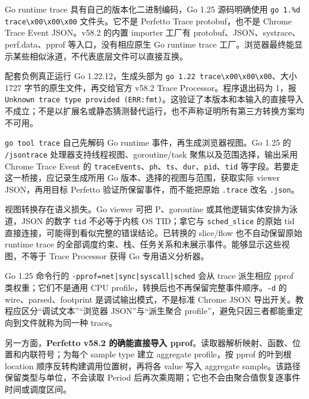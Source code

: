\documentclass[UTF8,fontset=fandol,openany,11pt]{ctexbook}
\begin{document}
Go runtime trace 具有自己的版本化二进制编码，Go 1.25 源码明确使用 \texttt{go 1.\allowbreak{}\%d trace\textbackslash{}x00\textbackslash{}x00\textbackslash{}x00} 文件头。它不是 Perfetto Trace protobuf，也不是 Chrome Trace Event JSON。v58.2 的内置 importer 工厂有 protobuf、JSON、systrace、perf.data、pprof 等入口，没有相应原生 Go runtime trace 工厂。浏览器最终能显示某些相似泳道，不代表底层文件可以直接互换。\cite{pf-go-header}\cite{pf-importers}


配套负例真正运行 Go 1.22.12，生成头部为 \texttt{go 1.\allowbreak{}22 trace\textbackslash{}x00\textbackslash{}x00\textbackslash{}x00}、大小 1727 字节的原生文件，再交给官方 v58.2 Trace Processor。程序退出码为 1，报 \texttt{Unknown trace type provided (ERR:fmt)}。这验证了本版本和本输入的直接导入不成立；不是以扩展名或静态猜测替代运行，也不声称证明所有第三方转换方案均不可用。\cite{pf-validation}


\texttt{go tool trace} 自己先解码 Go runtime 事件，再生成浏览器视图。Go 1.25 的 \texttt{/\allowbreak{}jsontrace} 处理器支持线程视图、goroutine/task 聚焦以及范围选择，输出采用 Chrome Trace Event 的 \texttt{traceEvents}、\texttt{ph}、\texttt{ts}、\texttt{dur}、\texttt{pid}、\texttt{tid} 等字段。若要走这一桥接，应记录生成所用 Go 版本、选择的视图与范围，获取实际 viewer JSON，再用目标 Perfetto 验证所保留事件，而不能把原始 \texttt{.\allowbreak{}trace} 改名 \texttt{.\allowbreak{}json}。\cite{pf-go-json}\cite{pf-go-format}


视图转换存在语义损失。Go viewer 可把 P、goroutine 或其他逻辑实体安排为泳道，JSON 的数字 \texttt{tid} 不必等于内核 OS TID；拿它与 \texttt{sched\_\allowbreak{}slice} 的原始 tid 直接连接，可能得到看似完整的错误结论。已转换的 slice/flow 也不自动保留原始 runtime trace 的全部调度约束、栈、任务关系和未展示事件。能够显示这些视图，不等于 Trace Processor 获得 Go 专用语义分析器。\cite{pf-go-json}\cite{pf-go-format}


Go 1.25 命令行的 \texttt{-\allowbreak{}pprof=net|sync|syscall|sched} 会从 trace 派生相应 pprof 类权重；它们不是通用 CPU profile，转换后也不再保留完整事件顺序。\texttt{-\allowbreak{}d} 的 wire、parsed、footprint 是调试输出模式，不是标准 Chrome JSON 导出开关。教程应区分“调试文本”“浏览器 JSON”与“派生聚合 profile”，避免只因三者都能重定向到文件就称为同一种 trace。\cite{pf-go-main}


另一方面，\textbf{Perfetto v58.2 的确能直接导入 pprof}。读取器解析映射、函数、位置和内联符号；为每个 sample type 建立 aggregate profile，按 pprof 的叶到根 location 顺序反转构建调用位置树，再将各 value 写入 aggregate sample。该路径保留类型与单位，不会读取 Period 后再次乘周期；它也不会由聚合值恢复逐事件时间或调度区间。\cite{pf-pprof}
\end{document}
